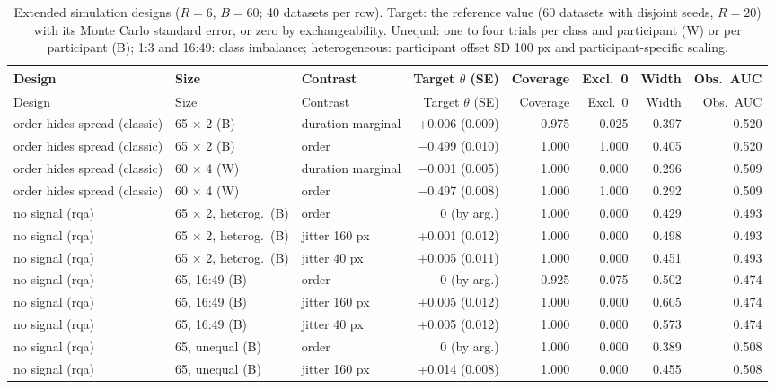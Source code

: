 \begin{longtable}{lllrrrrr}
\caption{Extended simulation designs ($R = 6$, $B = 60$; 40 datasets per row). Target: the reference value (60 datasets with disjoint seeds, $R = 20$) with its Monte Carlo standard error, or zero by exchangeability. Unequal: one to four trials per class and participant (W) or per participant (B); 1:3 and 16:49: class imbalance; heterogeneous: participant offset SD 100 px and participant-specific scaling.}\\
\toprule
Design & Size & Contrast & Target $\theta$ (SE) & Coverage & Excl.\ 0 & Width & Obs.\ AUC \\
\midrule
\endfirsthead
\toprule
Design & Size & Contrast & Target $\theta$ (SE) & Coverage & Excl.\ 0 & Width & Obs.\ AUC \\
\midrule
\endhead
\bottomrule
\endfoot
order hides spread (classic) & 65 $\times$ 2 (B) & duration marginal & +0.006 (0.009) & 0.975 & 0.025 & 0.397 & 0.520 \\
order hides spread (classic) & 65 $\times$ 2 (B) & order & $-$0.499 (0.010) & 1.000 & 1.000 & 0.405 & 0.520 \\
order hides spread (classic) & 60 $\times$ 4 (W) & duration marginal & $-$0.001 (0.005) & 1.000 & 0.000 & 0.296 & 0.509 \\
order hides spread (classic) & 60 $\times$ 4 (W) & order & $-$0.497 (0.008) & 1.000 & 1.000 & 0.292 & 0.509 \\
no signal (rqa) & 65 $\times$ 2, heterog.\ (B) & order & 0 (by arg.) & 1.000 & 0.000 & 0.429 & 0.493 \\
no signal (rqa) & 65 $\times$ 2, heterog.\ (B) & jitter 160 px & +0.001 (0.012) & 1.000 & 0.000 & 0.498 & 0.493 \\
no signal (rqa) & 65 $\times$ 2, heterog.\ (B) & jitter 40 px & +0.005 (0.011) & 1.000 & 0.000 & 0.451 & 0.493 \\
no signal (rqa) & 65, 16:49 (B) & order & 0 (by arg.) & 0.925 & 0.075 & 0.502 & 0.474 \\
no signal (rqa) & 65, 16:49 (B) & jitter 160 px & +0.005 (0.012) & 1.000 & 0.000 & 0.605 & 0.474 \\
no signal (rqa) & 65, 16:49 (B) & jitter 40 px & +0.005 (0.012) & 1.000 & 0.000 & 0.573 & 0.474 \\
no signal (rqa) & 65, unequal (B) & order & 0 (by arg.) & 1.000 & 0.000 & 0.389 & 0.508 \\
no signal (rqa) & 65, unequal (B) & jitter 160 px & +0.014 (0.008) & 1.000 & 0.000 & 0.455 & 0.508 \\

\end{longtable}

